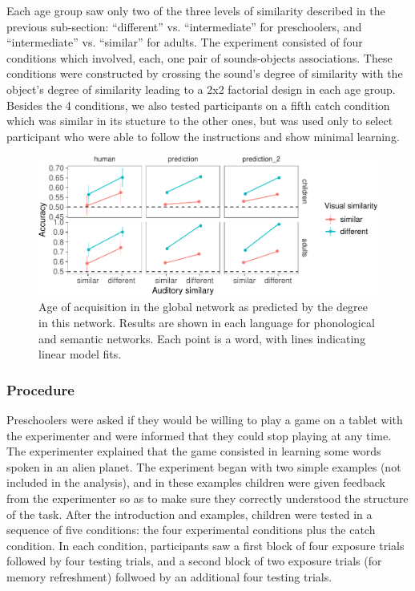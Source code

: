 \documentclass[10pt, letterpaper]{article}
\newenvironment{CodeChunk}{}{}
\begin{document}
Each age group saw only two of the three levels of similarity described
in the previous sub-section: ``different'' vs. ``intermediate'' for
preschoolers, and ``intermediate'' vs. ``similar'' for adults. The
experiment consisted of four conditions which involved, each, one pair
of sounds-objects associations. These conditions were constructed by
crossing the sound's degree of similarity with the object's degree of
similarity leading to a 2x2 factorial design in each age group. Besides
the 4 conditions, we also tested participants on a fifth catch condition
which was similar in its stucture to the other ones, but was used only
to select participant who were able to follow the instructions and show
minimal learning.

\begin{CodeChunk}
\begin{figure}[h]

{\centering \includegraphics{figs/all_data-1} 

}

\caption{\label{fig:data_all}Age of acquisition in the global network as predicted by the degree in this network. Results are shown in each language for phonological and semantic networks. Each point is a word, with lines indicating linear model fits.}\label{fig:all_data}
\end{figure}
\end{CodeChunk}

\subsubsection{Procedure}\label{procedure}

Preschoolers were asked if they would be willing to play a game on a
tablet with the experimenter and were informed that they could stop
playing at any time. The experimenter explained that the game consisted
in learning some words spoken in an alien planet. The experiment began
with two simple examples (not included in the analysis), and in these
examples children were given feedback from the experimenter so as to
make sure they correctly understood the structure of the task. After the
introduction and examples, children were tested in a sequence of five
conditions: the four experimental conditions plus the catch condition.
In each condition, participants saw a first block of four exposure
trials followed by four testing trials, and a second block of two
exposure trials (for memory refreshment) follwoed by an additional four
testing trials.
\end{document}
